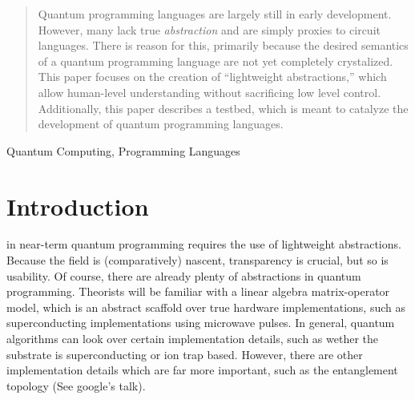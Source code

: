 \documentclass[journal]{IEEEtran}
\begin{document}


\maketitle

\begin{abstract}
Quantum programming languages are largely still in early development. 
However, many lack true \emph{abstraction} and are simply proxies to circuit languages. 
There is reason for this, primarily because the desired semantics of a quantum programming language are not yet completely crystalized. 
This paper focuses on the creation of ``lightweight abstractions,'' which allow human-level understanding without sacrificing low level control.
Additionally, this paper describes a testbed, which is meant to catalyze the development of quantum programming languages.
\end{abstract}

\begin{IEEEkeywords}
    Quantum Computing, Programming Languages
\end{IEEEkeywords}

\IEEEpeerreviewmaketitle


\section{Introduction}
 in near-term quantum programming requires the use of lightweight abstractions. 
Because the field is (comparatively) nascent, transparency is crucial, but so is usability.
Of course, there are already plenty of abstractions in quantum programming. 
Theorists will be familiar with a linear algebra matrix-operator model, which is an abstract scaffold over true hardware implementations, such as superconducting implementations using microwave pulses.
In general, quantum algorithms can look over certain implementation details, such as wether the substrate is superconducting or ion trap based. 
However, there are other implementation details which are far more important, such as the entanglement topology (See google's talk).
\end{document}
